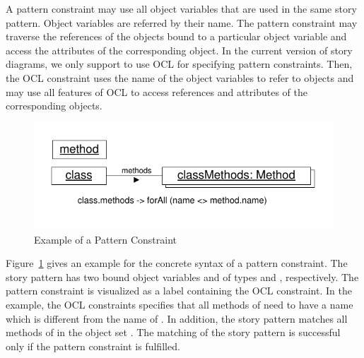 A pattern constraint may use all object variables that are used in the same story pattern. Object variables are referred by their name. The pattern constraint may traverse the references of the objects bound to a particular object variable and access the attributes of the corresponding object. In the current version of story diagrams, we only support to use OCL for specifying pattern constraints. Then, the OCL constraint uses the name of the object variables to refer to objects and may use all features of OCL to access references and attributes of the corresponding objects.

\begin{figure}[htbp]
\center
\includegraphics[width=0.6\columnwidth]{figures/PatternConstraint}
\caption{Example of a Pattern Constraint}
\label{fig:patternConstraint}
\end{figure}

Figure~\ref{fig:patternConstraint} gives an example for the concrete syntax of a pattern constraint. The story pattern has two bound object variables  and  of types  and , respectively. The pattern constraint is visualized as a label containing the OCL constraint. In the example, the OCL constraints specifies that all methods of  need to have a name which is different from the name of . In addition, the story pattern matches all methods of  in the object set . The matching of the story pattern is successful only if the pattern constraint is fulfilled.



